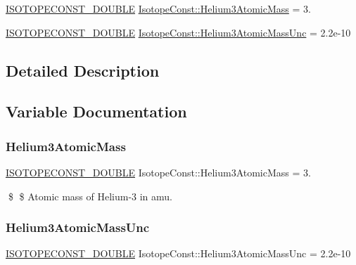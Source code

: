 \begin{DoxyCompactItemize}
\item 
\mbox{\hyperlink{group___isotope_const-_macros_ga8f45a7272ce02c0b4c65c44636ed719a}{I\+S\+O\+T\+O\+P\+E\+C\+O\+N\+S\+T\+\_\+\+D\+O\+U\+B\+LE}} \mbox{\hyperlink{group___isotope_const-_helium-_he3_gaeb736e36ce9059c5861dea559687aa6f}{Isotope\+Const\+::\+Helium3\+Atomic\+Mass}} = 3.
\item 
\mbox{\hyperlink{group___isotope_const-_macros_ga8f45a7272ce02c0b4c65c44636ed719a}{I\+S\+O\+T\+O\+P\+E\+C\+O\+N\+S\+T\+\_\+\+D\+O\+U\+B\+LE}} \mbox{\hyperlink{group___isotope_const-_helium-_he3_ga6eb4ccba2ca5c2b999b4b1f82312bdd0}{Isotope\+Const\+::\+Helium3\+Atomic\+Mass\+Unc}} = 2.\+2e-\/10
\end{DoxyCompactItemize}


\subsection{Detailed Description}


\subsection{Variable Documentation}
\mbox{\label{group___isotope_const-_helium-_he3_gaeb736e36ce9059c5861dea559687aa6f}} 
\subsubsection{\texorpdfstring{Helium3\+Atomic\+Mass}{Helium3AtomicMass}}
{\footnotesize\ttfamily \mbox{\hyperlink{group___isotope_const-_macros_ga8f45a7272ce02c0b4c65c44636ed719a}{I\+S\+O\+T\+O\+P\+E\+C\+O\+N\+S\+T\+\_\+\+D\+O\+U\+B\+LE}} Isotope\+Const\+::\+Helium3\+Atomic\+Mass = 3.}

\$ \$ Atomic mass of Helium-\/3 in amu. \mbox{\label{group___isotope_const-_helium-_he3_ga6eb4ccba2ca5c2b999b4b1f82312bdd0}} 
\subsubsection{\texorpdfstring{Helium3\+Atomic\+Mass\+Unc}{Helium3AtomicMassUnc}}
{\footnotesize\ttfamily \mbox{\hyperlink{group___isotope_const-_macros_ga8f45a7272ce02c0b4c65c44636ed719a}{I\+S\+O\+T\+O\+P\+E\+C\+O\+N\+S\+T\+\_\+\+D\+O\+U\+B\+LE}} Isotope\+Const\+::\+Helium3\+Atomic\+Mass\+Unc = 2.\+2e-\/10}


